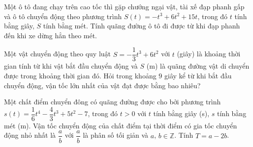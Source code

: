 \begin{bt}%

	Một ô tô đang chạy trên cao tốc thì gặp chướng ngại vật, tài xế đạp phanh gấp và ô tô chuyển động theo phương trình $S(t) =  - t^3 + 6t^2 + 15t$, trong đó $t$ tính bằng giây, $S$ tính bằng mét. Tính quãng đường ô tô đi được từ khi đạp phanh đến khi xe dừng hẳn theo mét. 
\end{bt}

\begin{bt}%
	Một vật chuyển động theo quy luật $S=-\dfrac{1}{3}t^3+6t^2$ với $t$ (giây) là khoảng thời gian tính từ khi vật bắt đầu chuyển động và $S$ (m) là quãng đường vật di chuyển được trong khoảng thời gian đó. Hỏi trong khoảng $9$ giây kể từ khi bắt đầu chuyển động, vận tốc lớn nhất của vật đạt được bằng bao nhiêu?
\end{bt}

\begin{bt}%
	Một chất điểm chuyển đông có quãng đường được cho bởi phương trình $s(t)=\dfrac{1}{6}t^4-\dfrac{4}{3}t^3+5t^2-7$, trong đó $t>0$ với $t$ tính bằng giây (s), $s$ tính bằng mét (m). Vận tốc chuyển động của chất điểm tại thời điểm có gia tốc chuyển động nhỏ nhất là $\dfrac{a}{b}$ với $\dfrac{a}{b}$ là phân số tối giản và $a$, $b\in \mathbb{Z}$. Tính $T=a-2b$.
\end{bt}

